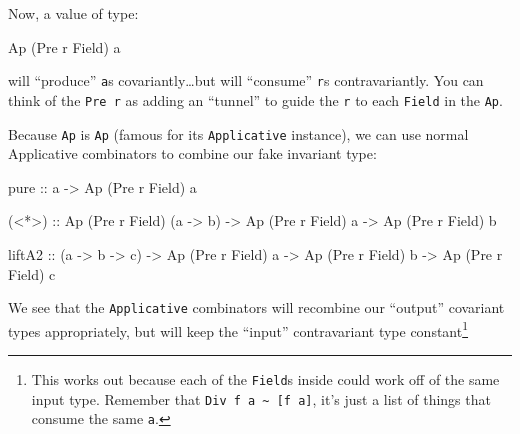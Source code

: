 \documentclass[]{article}
\newenvironment{Shaded}{}{}
\newcommand{\DataTypeTok}[1]{\textcolor[rgb]{0.56,0.13,0.00}{#1}}
\newcommand{\FunctionTok}[1]{\textcolor[rgb]{0.02,0.16,0.49}{#1}}
\newcommand{\NormalTok}[1]{#1}
\newcommand{\OperatorTok}[1]{\textcolor[rgb]{0.40,0.40,0.40}{#1}}
\newcommand{\OtherTok}[1]{\textcolor[rgb]{0.00,0.44,0.13}{#1}}
\begin{document}
Now, a value of type:

\begin{Shaded}
\begin{Highlighting}[]
\DataTypeTok{Ap}\NormalTok{ (}\DataTypeTok{Pre}\NormalTok{ r }\DataTypeTok{Field}\NormalTok{) a}
\end{Highlighting}
\end{Shaded}

will ``produce'' \texttt{a}s covariantly\ldots but will ``consume'' \texttt{r}s
contravariantly. You can think of the \texttt{Pre\ r} as adding an ``tunnel'' to
guide the \texttt{r} to each \texttt{Field} in the \texttt{Ap}.

Because \texttt{Ap} is \texttt{Ap} (famous for its \texttt{Applicative}
instance), we can use normal Applicative combinators to combine our fake
invariant type:

\begin{Shaded}
\begin{Highlighting}[]
\FunctionTok{pure}\OtherTok{ ::}\NormalTok{ a }\OtherTok{{-}\textgreater{}} \DataTypeTok{Ap}\NormalTok{ (}\DataTypeTok{Pre}\NormalTok{ r }\DataTypeTok{Field}\NormalTok{) a}

\NormalTok{(}\OperatorTok{\textless{}*\textgreater{}}\NormalTok{)}
\OtherTok{    ::} \DataTypeTok{Ap}\NormalTok{ (}\DataTypeTok{Pre}\NormalTok{ r }\DataTypeTok{Field}\NormalTok{) (a }\OtherTok{{-}\textgreater{}}\NormalTok{ b)}
    \OtherTok{{-}\textgreater{}} \DataTypeTok{Ap}\NormalTok{ (}\DataTypeTok{Pre}\NormalTok{ r }\DataTypeTok{Field}\NormalTok{) a}
    \OtherTok{{-}\textgreater{}} \DataTypeTok{Ap}\NormalTok{ (}\DataTypeTok{Pre}\NormalTok{ r }\DataTypeTok{Field}\NormalTok{) b}

\NormalTok{liftA2}
\OtherTok{    ::}\NormalTok{ (a }\OtherTok{{-}\textgreater{}}\NormalTok{ b }\OtherTok{{-}\textgreater{}}\NormalTok{ c)}
    \OtherTok{{-}\textgreater{}} \DataTypeTok{Ap}\NormalTok{ (}\DataTypeTok{Pre}\NormalTok{ r }\DataTypeTok{Field}\NormalTok{) a}
    \OtherTok{{-}\textgreater{}} \DataTypeTok{Ap}\NormalTok{ (}\DataTypeTok{Pre}\NormalTok{ r }\DataTypeTok{Field}\NormalTok{) b}
    \OtherTok{{-}\textgreater{}} \DataTypeTok{Ap}\NormalTok{ (}\DataTypeTok{Pre}\NormalTok{ r }\DataTypeTok{Field}\NormalTok{) c}
\end{Highlighting}
\end{Shaded}

We see that the \texttt{Applicative} combinators will recombine our ``output''
covariant types appropriately, but will keep the ``input'' contravariant type
constant\footnote{This works out because each of the \texttt{Field}s inside
  could work off of the same input type. Remember that
  \texttt{Div\ f\ a\ \textasciitilde{}\ {[}f\ a{]}}, it's just a list of things
  that consume the same \texttt{a}.}
\end{document}
